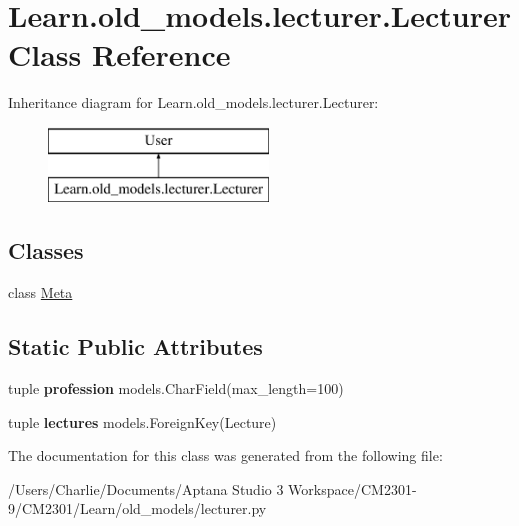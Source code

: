 \hypertarget{class_learn_1_1old__models_1_1lecturer_1_1_lecturer}{\section{Learn.\-old\-\_\-models.\-lecturer.\-Lecturer Class Reference}
\label{class_learn_1_1old__models_1_1lecturer_1_1_lecturer}
}
Inheritance diagram for Learn.\-old\-\_\-models.\-lecturer.\-Lecturer\-:\begin{figure}[H]
\begin{center}
\leavevmode
\includegraphics[height=2.000000cm]{class_learn_1_1old__models_1_1lecturer_1_1_lecturer}
\end{center}
\end{figure}
\subsection*{Classes}
\begin{DoxyCompactItemize}
\item 
class \hyperlink{class_learn_1_1old__models_1_1lecturer_1_1_lecturer_1_1_meta}{Meta}
\end{DoxyCompactItemize}
\subsection*{Static Public Attributes}
\begin{DoxyCompactItemize}
\item 
\hypertarget{class_learn_1_1old__models_1_1lecturer_1_1_lecturer_a63338f93b9f3be069e08addee1eda971}{tuple {\bfseries profession} models.\-Char\-Field(max\-\_\-length=100)}\label{class_learn_1_1old__models_1_1lecturer_1_1_lecturer_a63338f93b9f3be069e08addee1eda971}

\item 
\hypertarget{class_learn_1_1old__models_1_1lecturer_1_1_lecturer_a50734669b4b00936aede7e4bdc7225d0}{tuple {\bfseries lectures} models.\-Foreign\-Key(Lecture)}\label{class_learn_1_1old__models_1_1lecturer_1_1_lecturer_a50734669b4b00936aede7e4bdc7225d0}

\end{DoxyCompactItemize}


The documentation for this class was generated from the following file\-:\begin{DoxyCompactItemize}
\item 
/\-Users/\-Charlie/\-Documents/\-Aptana Studio 3 Workspace/\-C\-M2301-\/9/\-C\-M2301/\-Learn/old\-\_\-models/lecturer.\-py\end{DoxyCompactItemize}

